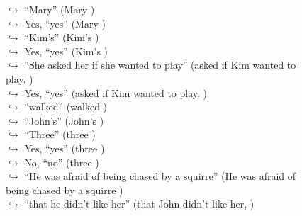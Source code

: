 \documentclass[11pt,a4paper, onecolumn]{article}
\begin{document}
\begin{figure}[t] \small \begin{tcolorbox}[boxsep=0pt,left=5pt,right=0pt,top=2pt,colback = yellow!5] \begin{dialogue}
 \small 
\colorbox{pink!25}{$\hookrightarrow$}
{ ``Mary'' (Mary ) }
\\
\colorbox{pink!25}{$\hookrightarrow$}
\colorbox{red!25}{Yes,}
{ ``yes'' (Mary ) }
\\
\colorbox{pink!25}{$\hookrightarrow$}
{ ``Kim's'' (Kim's ) }
\\
\colorbox{pink!25}{$\hookrightarrow$}
\colorbox{red!25}{Yes,}
{ ``yes'' (Kim's ) }
\\
\colorbox{pink!25}{$\hookrightarrow$}
{ ``She asked her if she wanted to play'' (asked if Kim wanted to play. ) }
\\
\colorbox{pink!25}{$\hookrightarrow$}
\colorbox{red!25}{Yes,}
{ ``yes'' (asked if Kim wanted to play. ) }
\\
\colorbox{pink!25}{$\hookrightarrow$}
{ ``walked'' (walked ) }
\\
\colorbox{pink!25}{$\hookrightarrow$}
{ ``John's'' (John's ) }
\\
\colorbox{pink!25}{$\hookrightarrow$}
{ ``Three'' (three ) }
\\
\colorbox{pink!25}{$\hookrightarrow$}
\colorbox{red!25}{Yes,}
{ ``yes'' (three ) }
\\
\colorbox{pink!25}{$\hookrightarrow$}
\colorbox{red!25}{No,}
{ ``no'' (three ) }
\\
\colorbox{pink!25}{$\hookrightarrow$}
{ ``He was afraid of being chased by a squirre'' (He was afraid of being chased by a squirre ) }
\\
\colorbox{pink!25}{$\hookrightarrow$}
{ ``that he didn't like her'' (that John didn't like her, ) }

\end{dialogue}
\end{tcolorbox}
\end{figure}
\end{document}
